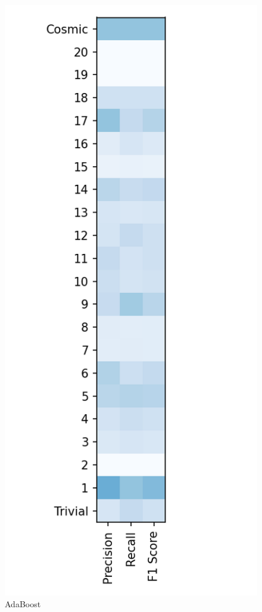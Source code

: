 \documentclass{article}
\begin{document}
\begin{figure}[ht]
\begin{minipage}[b]{0.32\linewidth}
			\caption*{AdaBoost} 
			\vspace{10ex}
		\end{minipage} \hfill
		\begin{minipage}[b]{0.32\linewidth}
			\centering
			\includegraphics[width=\linewidth]{22 - Decision Tree.png} 

\end{minipage}
\end{figure}
\end{document}
